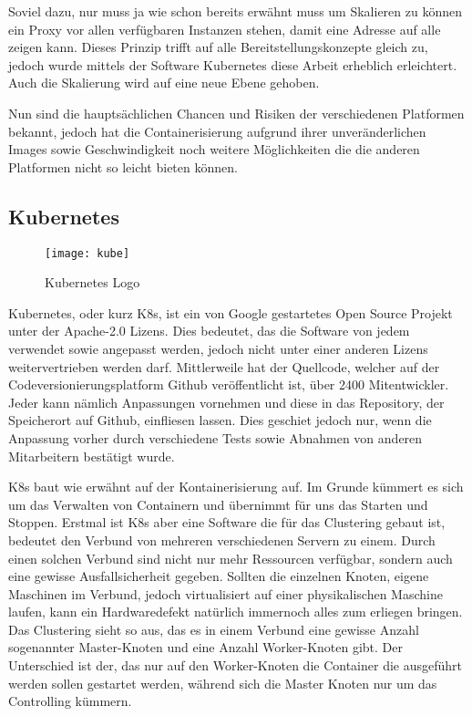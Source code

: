 Soviel dazu, nur muss ja wie schon bereits erwähnt muss um Skalieren zu können ein Proxy vor allen verfügbaren Instanzen stehen, damit eine Adresse auf alle zeigen kann.
Dieses Prinzip trifft auf alle Bereitstellungskonzepte gleich zu, jedoch wurde mittels der Software Kubernetes diese Arbeit erheblich erleichtert. Auch die Skalierung
wird auf eine neue Ebene gehoben.

Nun sind die hauptsächlichen Chancen und Risiken der verschiedenen Platformen bekannt, jedoch hat die Containerisierung aufgrund ihrer 
unveränderlichen Images sowie Geschwindigkeit noch weitere Möglichkeiten die die anderen Platformen nicht so leicht bieten können.

\subsection{Kubernetes}

\begin{figure}[H]
\caption{Kubernetes Logo}
\texttt{[image: kube]}
\\
\cite[][27.03.2020]{Quelle: https://bit.ly/3afiIMv}
\end{figure}

Kubernetes, oder kurz K8s, ist ein von Google gestartetes Open Source Projekt unter der Apache-2.0 Lizens. Dies bedeutet, das die Software von jedem verwendet sowie angepasst werden, 
jedoch nicht unter einer anderen Lizens weitervertrieben werden darf. Mittlerweile hat der Quellcode, welcher auf der Codeversionierungsplatform Github veröffentlicht ist, über 2400 Mitentwickler.
Jeder kann nämlich Anpassungen vornehmen und diese in das Repository, der Speicherort auf Github, einfliesen lassen. Dies geschiet jedoch nur, wenn die Anpassung
vorher durch verschiedene Tests sowie Abnahmen von anderen Mitarbeitern bestätigt wurde.

K8s baut wie erwähnt auf der Kontainerisierung auf. Im Grunde kümmert es sich um das Verwalten von Containern und übernimmt für uns das Starten und Stoppen.
Erstmal ist K8s aber eine Software die für das Clustering gebaut ist, bedeutet den Verbund von mehreren verschiedenen Servern zu einem. Durch einen solchen Verbund sind nicht nur mehr Ressourcen verfügbar,
sondern auch eine gewisse Ausfallsicherheit gegeben. Sollten die einzelnen Knoten, eigene Maschinen im Verbund, jedoch virtualisiert auf einer physikalischen Maschine laufen, kann ein Hardwaredefekt natürlich immernoch
alles zum erliegen bringen.
Das Clustering sieht so aus, das es in einem Verbund eine gewisse Anzahl sogenannter Master-Knoten und eine Anzahl Worker-Knoten gibt. Der Unterschied ist der, das nur auf den Worker-Knoten
die Container die ausgeführt werden sollen gestartet werden, während sich die Master Knoten nur um das Controlling kümmern.

